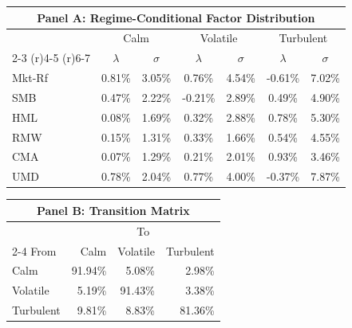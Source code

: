 \begin{tabular}{lcccccc}
\toprule
\multicolumn{7}{c}{Panel A: Regime-Conditional Factor Distribution} \\
\midrule
 & \multicolumn{2}{c}{Calm} & \multicolumn{2}{c}{Volatile} & \multicolumn{2}{c}{Turbulent} \\
 \cmidrule(r){2-3}
 \cmidrule(r){4-5}
 \cmidrule(r){6-7}
 & $\lambda$ & $\sigma$ & $\lambda$ & $\sigma$ & $\lambda$ & $\sigma$ \\
\midrule
Mkt-Rf & 0.81\% & 3.05\% & 0.76\% & 4.54\% & -0.61\% & 7.02\% \\
SMB & 0.47\% & 2.22\% & -0.21\% & 2.89\% & 0.49\% & 4.90\% \\
HML & 0.08\% & 1.69\% & 0.32\% & 2.88\% & 0.78\% & 5.30\% \\
RMW & 0.15\% & 1.31\% & 0.33\% & 1.66\% & 0.54\% & 4.55\% \\
CMA & 0.07\% & 1.29\% & 0.21\% & 2.01\% & 0.93\% & 3.46\% \\
UMD & 0.78\% & 2.04\% & 0.77\% & 4.00\% & -0.37\% & 7.87\% \\
\bottomrule
\end{tabular}

\bigskip

\begin{tabular}[t]{lrrr}
\toprule
\multicolumn{4}{c}{Panel B: Transition Matrix} \\
\midrule & \multicolumn{3}{c}{To} \\
\cmidrule(r){2-4}
From & Calm & Volatile & Turbulent \\
\midrule
Calm & 91.94\% & 5.08\% & 2.98\% \\
Volatile & 5.19\% & 91.43\% & 3.38\% \\
Turbulent & 9.81\% & 8.83\% & 81.36\% \\
\bottomrule
\end{tabular}
